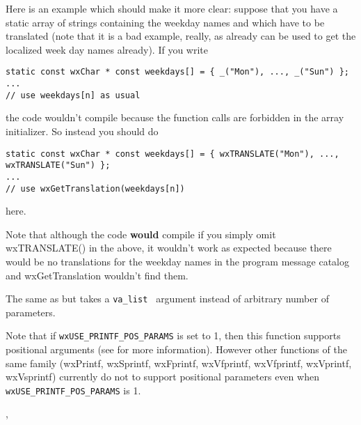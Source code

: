 Here is an example which should make it more clear: suppose that you have a
static array of strings containing the weekday names and which have to be
translated (note that it is a bad example, really, as
 already can be used to get the localized week
day names already). If you write

\begin{verbatim}
static const wxChar * const weekdays[] = { _("Mon"), ..., _("Sun") };
...
// use weekdays[n] as usual
\end{verbatim}

the code wouldn't compile because the function calls are forbidden in the array
initializer. So instead you should do

\begin{verbatim}
static const wxChar * const weekdays[] = { wxTRANSLATE("Mon"), ..., wxTRANSLATE("Sun") };
...
// use wxGetTranslation(weekdays[n])
\end{verbatim}

here.

Note that although the code {\bf would} compile if you simply omit
wxTRANSLATE() in the above, it wouldn't work as expected because there would be
no translations for the weekday names in the program message catalog and
wxGetTranslation wouldn't find them.

\label{wxvsnprintf}


The same as  but takes a {\tt va\_list }
argument instead of arbitrary number of parameters.

Note that if \texttt{wxUSE\_PRINTF\_POS\_PARAMS} is set to 1, then this function supports
positional arguments (see  for more information).
However other functions of the same family (wxPrintf, wxSprintf, wxFprintf, wxVfprintf,
wxVfprintf, wxVprintf, wxVsprintf) currently do not to support positional parameters
even when \texttt{wxUSE\_PRINTF\_POS\_PARAMS} is 1.


, 



\membersection{\_}\label{underscore}


